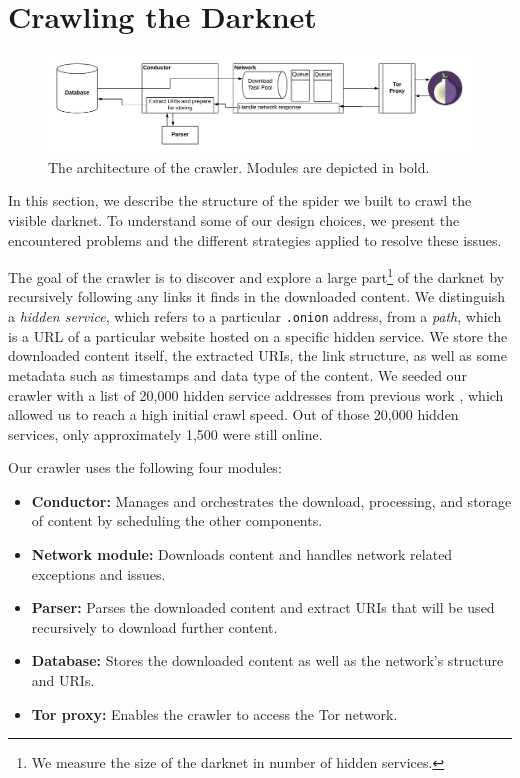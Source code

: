 \section{Crawling the Darknet}
\begin{figure}[H]
\includegraphics[width=\linewidth]{images/ArchitecturalSchema.png}
\caption{The architecture of the crawler. Modules are depicted in bold.~\cite{Loconte}}
\label{fig:scraperArchitecture}
\end{figure}
In this section, we describe the structure of the spider we built to crawl the visible darknet. To understand some of our design choices, we present the encountered problems and the different strategies applied to resolve these issues. 

The goal of the crawler is to discover and explore a large part\footnote{We measure the size of the darknet in number of hidden services.} of the darknet by recursively following any links it finds in the downloaded content. We distinguish a \emph{hidden service}, which refers to a particular \texttt{.onion} address, from a \emph{path}, which is a URL of a particular website hosted on a specific hidden service.  We store the downloaded content itself, the extracted URIs, the link structure, as well as some metadata such as timestamps and data type of the content.
We seeded our crawler with a list of 20,000 hidden service addresses from previous work \cite{Kadianakis2017}, which allowed us to reach a high initial crawl speed. Out of those 20,000 hidden services, only approximately 1,500 were still online. 

Our crawler uses the following four modules:
\begin{itemize}
    \item \textbf{Conductor:} Manages and orchestrates the download, processing, and storage of content by scheduling the other components.
    \item \textbf{Network module:} Downloads content and handles network related exceptions and issues.
    \item \textbf{Parser:} Parses the downloaded content and extract URIs that will be used recursively to download further content.
    \item \textbf{Database:} Stores the downloaded content as well as the network's structure and URIs.
    \item \textbf{Tor proxy:} Enables the crawler to access the Tor network. 
\end{itemize}

